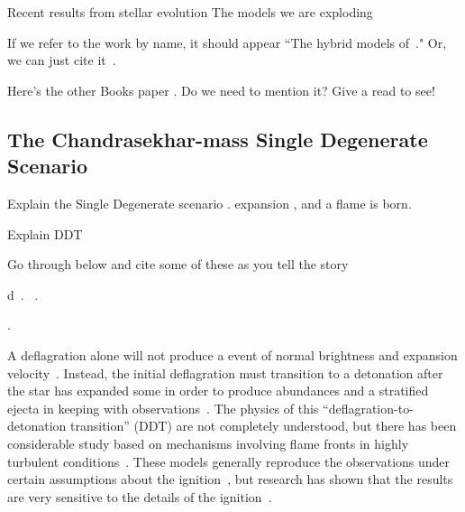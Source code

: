 \documentclass[iop,apj]{emulateapj}
\begin{document}
Recent results from stellar evolution
The models we are exploding \citep{brooksetal2017}

If we refer to the work by name, it should appear ``The hybrid models
of~\citet{brooksetal2017}." Or, we can just cite it~\citep{brooksetal2017}.

Here's the other Books paper \citep{brookset2017}. Do we need to mention it?
Give a read to see!


\subsection{The Chandrasekhar-mass Single Degenerate Scenario}

Explain the Single Degenerate scenario
\citep{Baraffe2004Stability-of-Su,WoosWunsKuhl04,wunschwoosley2004,Kuhletal06,nonakaetal2012}.
expansion \citep{Nomo84,WoosWunsKuhl04}, and a flame is born. 

Explain DDT

Go through below and cite some of these as you tell the story

d~\citep{arnett.truran.ea:nucleosynthesis}.
~\citep{mazzalietal2008}.  


\citep{khokhlov1993,bychovliberman1995,
SNrt,Khok95,NiemHill95,khoketal1997,ZingDurs07,
cholazarianvishniac2003,
roepkehn2003,roepkehn2004,
Zingale2005Three-dimension,Schmetal06a, Schmetal06b,Aspdetal08,
Woosetal09,csetal2009,hicksrosner2013,c-ssr2013,
jacketal2014,poludnenko2015,hicks2015}.


A deflagration alone will not produce a event of normal brightness and
expansion velocity~\citep{roepkeetal07}. Instead, the initial
deflagration must transition to a detonation after the star has
expanded some in order to produce abundances and a stratified ejecta
in keeping with
observations~\citep{Khokhlov1991Delayed-detonat,hokowh95}.
The physics of this ``deflagration-to-detonation transition'' (DDT)
are not completely understood, but there has been considerable study
based on mechanisms involving flame fronts in highly turbulent
conditions~\citep{1986SvAL, woosley90, Khokhlov1991Delayed-detonat,
  hokowh95, HoefKhok96, khoketal1997, NiemWoos97, hwt98, Niem99,
  GameKhokOran05,roepke07, poletal2011,c-ssr2013,poludnenko2015}.
These models generally reproduce the observations under certain
assumptions about the ignition~\citep{townetal2009}, but research has
shown that the results are very sensitive to the details of the
ignition~\citep{PlewCaldLamb04,GameKhokOran05,garciasenz:2005,
  roepkeetal07,Jordan2008Three-Dimension}.
\end{document}

